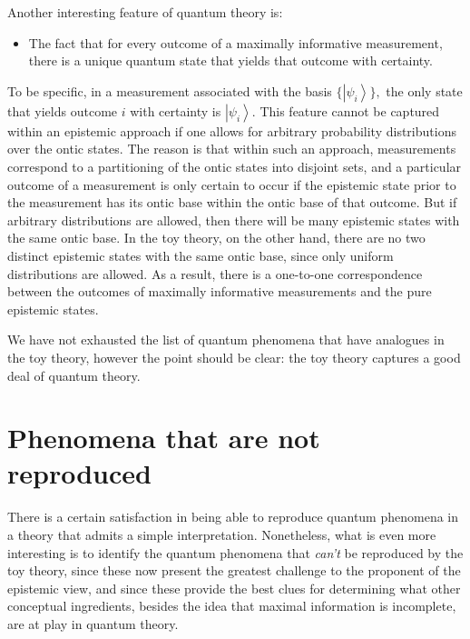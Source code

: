 \documentclass[pra,nofootinbib,showpacs,12pt]{revtex4}
\begin{document}
Another interesting feature of quantum theory is:

\begin{itemize}
\item The fact that for every outcome of a maximally informative
measurement, there is a unique quantum state that yields that outcome with
certainty.
\end{itemize}

To be specific, in a measurement associated with the basis $\{\left| \psi
_{i}\right\rangle \},$ the only state that yields outcome $i$ with certainty
is $\left| \psi _{i}\right\rangle .$ This feature cannot be captured within
an epistemic approach if one allows for arbitrary probability distributions
over the ontic states. The reason is that within such an approach,
measurements correspond to a partitioning of the ontic states into disjoint
sets, and a particular outcome of a measurement is only certain to occur if
the epistemic state prior to the measurement has its ontic base within the
ontic base of that outcome. But if arbitrary distributions are allowed, then
there will be many epistemic states with the same ontic base. In the toy
theory, on the other hand, there are no two distinct epistemic states with
the same ontic base, since only uniform distributions are allowed. As a
result, there is a one-to-one correspondence between the outcomes of
maximally informative measurements and the pure epistemic states.

We have not exhausted the list of quantum phenomena that have analogues in
the toy theory, however the point should be clear: the toy theory captures a
good deal of quantum theory.

\section{Phenomena that are not reproduced}

\label{phenomenathatdonotarise}

There is a certain satisfaction in being able to reproduce quantum phenomena
in a theory that admits a simple interpretation. Nonetheless, what is even
more interesting is to identify the quantum phenomena that \emph{can't }be
reproduced by the toy theory, since these now present the greatest challenge
to the proponent of the epistemic view, and since these provide the best
clues for determining what other conceptual ingredients, besides the idea
that maximal information is incomplete, are at play in quantum theory.
\end{document}
